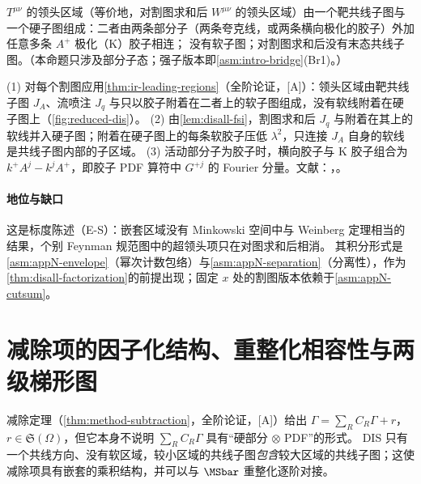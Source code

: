 \begin{proposition}\label{prop:disall-regions}
$T^{\mu\nu}$ 的领头区域（等价地，对割图求和后 $W^{\mu\nu}$ 的领头区域）由一个靶共线子图与一个硬子图组成：二者由两条部分子（两条夸克线，或两条横向极化的胶子）外加任意多条 $A^+$ 极化（K）胶子相连；
没有软子图；对割图求和后没有末态共线子图。（本命题只涉及部分子态；强子版本即\cref{asm:intro-bridge}(Br1)。）
\end{proposition}

\begin{proofsketch}
(1) 对每个割图应用\cref{thm:ir-leading-regions}（全阶论证，[A]）：领头区域由靶共线子图 $J_A$、流喷注 $J_q$ 与只以胶子附着在二者上的软子图组成，没有软线附着在硬子图上（\cref{fig:reduced-dis}）。
(2) 由\cref{lem:disall-fsi}，割图求和后 $J_q$ 与附着在其上的软线并入硬子图；附着在硬子图上的每条软胶子压低 $\lambda^2$，只连接 $J_A$ 自身的软线是共线子图内部的子区域。
(3) 活动部分子为胶子时，横向胶子与 K 胶子组合为 $k^+A^j-k^jA^+$，即胶子 PDF 算符中 $G^{+j}$ 的 Fourier 分量。文献：\cite{LibbySterman1978a}，\cite[第~8.7~节]{CollinsSoperSterman1989}。
\end{proofsketch}

\paragraph{地位与缺口}
这是标度陈述（E-S）：嵌套区域没有 Minkowski 空间中与 Weinberg 定理相当的结果，个别 Feynman 规范图中的超领头项只在对图求和后相消。
其积分形式是\cref{asm:appN-envelope}（幂次计数包络）与\cref{asm:appN-separation}（分离性），作为\cref{thm:disall-factorization}的前提出现；固定 $x$ 处的割图版本依赖于\cref{asm:appN-cutsum}。
\section{减除项的因子化结构、重整化相容性与两级梯形图}\label{sec:disall-subtraction}

减除定理（\cref{thm:method-subtraction}，全阶论证，[A]）给出 $\Gamma=\sum_RC_R\Gamma+r$，$r\in\mathfrak S(\Omega)$，但它本身不说明 $\sum_RC_R\Gamma$ 具有“硬部分 $\otimes$ PDF”的形式。
DIS 只有一个共线方向、没有软区域，较小区域的共线子图\emph{包含}较大区域的共线子图；这使减除项具有嵌套的乘积结构，并可以与 $\MSbar$ 重整化逐阶对接。

